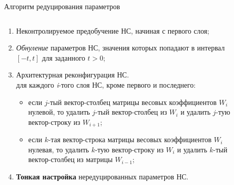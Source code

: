 \documentclass[10pt]{beamer}
\begin{document}
        \begin{frame}{Алгоритм редуцирования параметров}
        \begin{columns}
            \begin{column}{0.6\textwidth}
            \begin{enumerate}
                \item Неконтролируемое предобучение НС, начиная с первого слоя;
                \item \textit{Обнуление} параметров НС, значения которых попадают в интервал $[-t, t]$ для заданного $t>0$;
                \item Архитектурная реконфигурация НС.\\
                    для каждого \textit{i}-того слоя НС, кроме первого и последнего:
                    \begin{itemize}
                        \item если $j$-тый вектор-столбец матрицы весовых коэффициентов $W_i$ нулевой, то удалить $j$-тый вектор-столбец из $W_i$ и удалить $j$-тую вектор-строку из $W_{i+1}$;
                        \item если $k$-тая вектор-строка матрицы весовых коэффициентов $W_i$ нулевая, то удалить $k$-тую вектор-строку из $W_i$ и удалить $k$-тый вектор-столбец из матрицы $W_{i-1}$;
                    \end{itemize}
                \item \textbf{Тонкая настройка} нередуцированных параметров НС.
            \end{enumerate}
            \end{column}
            \begin{column}{0.4\textwidth}
                \begin{figure}[H]
                    \centering

\end{figure}
\end{column}
\end{columns}
\end{frame}
\end{document}
